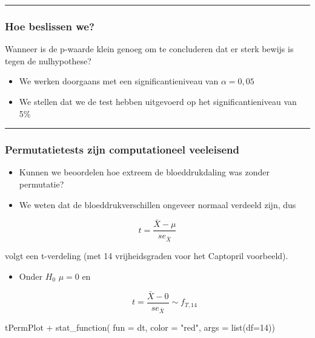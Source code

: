 \documentclass[
  dutch,
  letterpaper,
  12pt]{book}
\newenvironment{Shaded}{\begin{snugshade}}{\end{snugshade}}
\newcommand{\AttributeTok}[1]{\textcolor[rgb]{0.40,0.45,0.13}{#1}}
\newcommand{\DecValTok}[1]{\textcolor[rgb]{0.68,0.00,0.00}{#1}}
\newcommand{\FunctionTok}[1]{\textcolor[rgb]{0.28,0.35,0.67}{#1}}
\newcommand{\NormalTok}[1]{\textcolor[rgb]{0.00,0.23,0.31}{#1}}
\newcommand{\SpecialCharTok}[1]{\textcolor[rgb]{0.37,0.37,0.37}{#1}}
\newcommand{\StringTok}[1]{\textcolor[rgb]{0.13,0.47,0.30}{#1}}
\theoremstyle{definition}
\theoremstyle{definition}
\theoremstyle{definition}
\theoremstyle{remark}
\begin{document}
\begin{center}\rule{0.5\linewidth}{0.5pt}\end{center}

\subsubsection{Hoe beslissen we?}\label{hoe-beslissen-we}

Wanneer is de p-waarde klein genoeg om te concluderen dat er sterk
bewijs is tegen de nulhypothese?

\begin{itemize}
\item
  We werken doorgaans met een significantieniveau van \(\alpha = 0,05\)
\item
  We stellen dat we de test hebben uitgevoerd op het significantieniveau
  van 5\%
\end{itemize}

\begin{center}\rule{0.5\linewidth}{0.5pt}\end{center}

\subsubsection{Permutatietests zijn computationeel
veeleisend}\label{permutatietests-zijn-computationeel-veeleisend}

\begin{itemize}
\item
  Kunnen we beoordelen hoe extreem de bloeddrukdaling was zonder
  permutatie?
\item
  We weten dat de bloeddrukverschillen ongeveer normaal verdeeld zijn,
  dus
\end{itemize}

\[t=\frac{\bar X - \mu}{se_{\bar X}}\]

volgt een t-verdeling (met 14 vrijheidsgraden voor het Captopril
voorbeeld).

\begin{itemize}
\item
  Onder \(H_0\) \(\mu=0\) en

  \[t=\frac{\bar X-0}{se_{\bar X}}\sim f_{T,14}\]
\end{itemize}

\begin{Shaded}
\begin{Highlighting}[]
\NormalTok{tPermPlot }\SpecialCharTok{+}
  \FunctionTok{stat\_function}\NormalTok{(}
    \AttributeTok{fun =}\NormalTok{ dt,}
    \AttributeTok{color =} \StringTok{"red"}\NormalTok{,}
    \AttributeTok{args =} \FunctionTok{list}\NormalTok{(}\AttributeTok{df=}\DecValTok{14}\NormalTok{))}
\end{Highlighting}
\end{Shaded}
\end{document}

